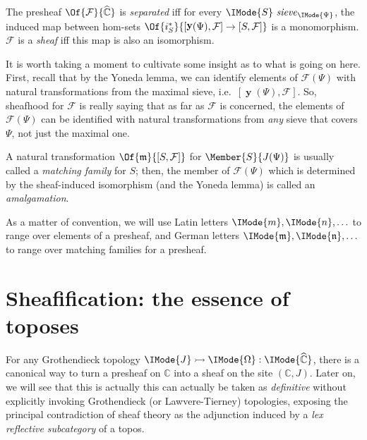 \documentclass{article}
\DeclareMathOperator\OpYoneda{\mathbf{y}}
\newcommand\Yoneda[1]{\OpYoneda({#1})}
\newcommand\Psh[1]{\widehat{#1}}
\newcommand\IsSubobject[3]{\IMode{#1}\rightarrowtail\IMode{#2}:\IMode{#3}}
\newcommand\IsSieve[2]{\IMode{#2}\ \mathit{sieve}_{\IMode{#1}}}
\begin{document}
\begin{definition}
  The presheaf $\Of{\mathcal{F}}{\Psh{\mathbb{C}}}$ is
  \emph{separated} iff for every $\IsSieve{\Psi}{S}$, the induced map
  between hom-sets
  $\Of{i_S^*}{[\Yoneda{\Psi},\mathcal{F}]\to[S,\mathcal{F}]}$ is a
  monomorphism. $\mathcal{F}$ is a \emph{sheaf} iff this map is also
  an isomorphism.
\end{definition}

It is worth taking a moment to cultivate some insight as to what is
going on here. First, recall that by the Yoneda lemma, we can identify
elements of $\mathcal{F}(\Psi)$ with natural transformations from the
maximal sieve, i.e.\ $[\Yoneda{\Psi},\mathcal{F}]$. So, sheafhood for
$\mathcal{F}$ is really saying that as far as $\mathcal{F}$ is
concerned, the elements of $\mathcal{F}(\Psi)$ can be identified with
natural transformations from \emph{any} sieve that covers $\Psi$, not
just the maximal one.

\begin{definition}
  A natural transformation $\Of{\mathfrak{m}}{[S,\mathcal{F}]}$ for
  $\Member{S}{J(\Psi)}$ is usually called a \emph{matching family} for
  $S$; then, the member of $\mathcal{F}(\Psi)$ which is determined by the
  sheaf-induced isomorphism (and the Yoneda lemma) is called an
  \emph{amalgamation}.
\end{definition}

\begin{notation}
  As a matter of convention, we will use Latin letters
  $\IMode{m},\IMode{n},\ldots$ to range over elements of a presheaf,
  and German letters
  $\IMode{\mathfrak{m}},\IMode{\mathfrak{n}},\ldots$ to range over
  matching families for a presheaf.
\end{notation}


\section{Sheafification: the essence of toposes}

For any Grothendieck topology
$\IsSubobject{J}{\Omega}{\Psh{\mathbb{C}}}$, there is a canonical way
to turn a presheaf on $\mathbb{C}$ into a sheaf on the site
$(\mathbb{C},J)$. Later on, we will see that this is actually this can
actually be taken as \emph{definitive} without explicitly invoking
Grothendieck (or Lawvere-Tierney) topologies, exposing the principal
contradiction of sheaf theory as the adjunction induced by a \emph{lex
  reflective subcategory} of a topos.
\end{document}
